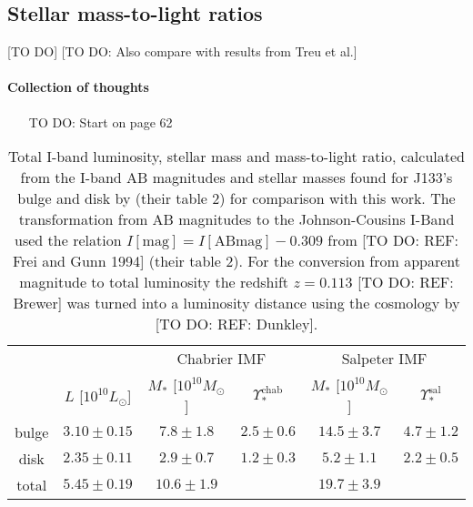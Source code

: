 \subsection{Stellar mass-to-light ratios}



[TO DO] [TO DO: Also compare with results from Treu et al.]

\paragraph{Collection of thoughts}
\begin{itemize}
\item [TO DO: Start on page 62]
\end{itemize}

\begin{table}
\centering
\begin{tabular}{cccccc}
\hline\hline
& & \multicolumn{2}{c}{Chabrier IMF} & \multicolumn{2}{c}{Salpeter IMF}\\
      &  $L$ [$10^{10}L_{\odot}$]                & $M_*$ [$10^{10}M_\odot$]               & $\Upsilon_*^\text{chab}$ & $M_*$ [$10^{10}M_\odot$] & $\Upsilon_*^\text{sal}$ \\\hline
bulge &   $3.10 \pm 0.15 $  & $7.8 \pm 1.8$ & $2.5 \pm 0.6$ & $14.5 \pm 3.7 $ & $4.7 \pm 1.2$ \\
disk  &   $2.35 \pm 0.11 $  & $2.9 \pm 0.7$ & $1.2 \pm 0.3$ & $5.2 \pm 1.1$ & $2.2 \pm 0.5$ \\
total &   $5.45 \pm 0.19$ & $10.6 \pm 1.9$& & $19.7 \pm 3.9$&\\\hline
\end{tabular}
\caption{Total I-band luminosity, stellar mass and mass-to-light ratio, calculated from the I-band AB magnitudes and stellar masses found for J133's bulge and disk by \citet{SWELLS} (their table 2) for comparison with this work. The transformation from AB magnitudes to the Johnson-Cousins I-Band used the relation $I[\text{mag}] = I[\text{ABmag}] - 0.309$ from [TO DO: REF: Frei and Gunn 1994] (their table 2). For the conversion from apparent magnitude to total luminosity the redshift $z=0.113$ [TO DO: REF: Brewer] was turned into a luminosity distance using the cosmology by [TO DO: REF: Dunkley]. }
\label{tab:previousresults}
\end{table}